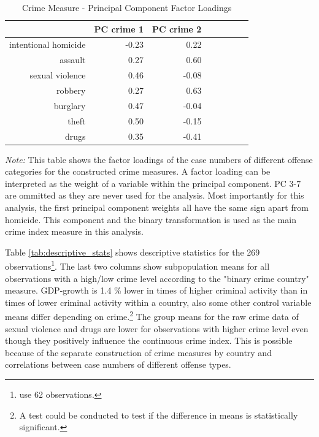\documentclass[a4paper,12pt]{article}
\begin{document}
\begin{singlespace}
		\begin{table}[!htbp]
			\centering
			\def\sym#1{\ifmmode^{#1}\else\(^{#1}\)\fi}
			\begin{threeparttable}
				\caption{Crime Measure - Principal Component Factor Loadings}\label{pca_factor_loadings} 
\begin{tabular}{rrrrrrrr}
  \hline
 & PC crime 1 & PC crime 2 \\ 
  \hline
intentional homicide & -0.23 & 0.22 \\ 
  assault & 0.27 & 0.60 \\ 
  sexual violence & 0.46 & -0.08  \\ 
  robbery & 0.27 & 0.63 \\ 
  burglary & 0.47 & -0.04\\ 
  theft & 0.50 & -0.15  \\ 
  drugs & 0.35 & -0.41 \\ 
   \hline
\end{tabular}
\begin{footnotesize}
				\begin{tablenotes}
					\item \textit{Note:} This table shows the factor loadings of the case numbers of different offense categories for the constructed crime measures. A factor loading can be interpreted as the weight of a variable within the principal component. PC 3-7 are ommitted as they are never used for the analysis. Most importantly for this analysis, the first principal component weights all have the same sign apart from homicide. This component and the binary transformation is used as the main crime index measure in this analysis.\\ 
				\end{tablenotes}
			\end{footnotesize}
			\end{threeparttable}
\end{table} 
\end{singlespace}

Table \ref{tab:descriptive_stats} shows descriptive statistics for the 269 observations\footnote{\cite{entorf} use 62 observations.}. The last two columns show subpopulation means for all observations with a high/low crime level according to the "binary crime country" measure. GDP-growth is 1.4 \% lower in times of higher criminal activity than in times of lower criminal activity within a country, also some other control variable means differ depending on crime.\footnote{A test could be conducted to test if the difference in means is statistically significant.} The group means for the raw crime data of sexual violence and drugs are lower for observations with higher crime level even though they positively influence the continuous crime index. This is possible because of the separate construction of crime measures by country and correlations between case numbers of different offense types.
\end{document}
